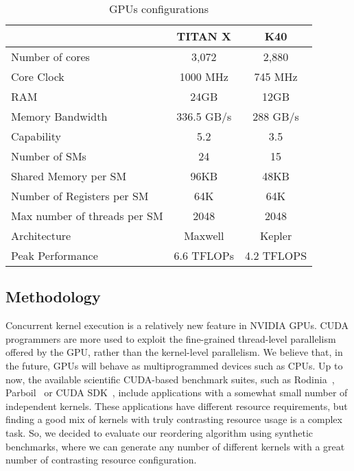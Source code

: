 \documentclass[conference]{IEEEtran}
\begin{document}
\begin{table}[]
    \centering
    \begin{tabular}{|l|c|c|} \hline
                             &  \textbf{TITAN} X & \textbf{K40} \\ \hline
Number of cores              & 3,072             & 2,880        \\ \hline
Core Clock                   & 1000 MHz          & 745 MHz      \\ \hline
RAM                          & 24GB              & 12GB         \\ \hline
Memory Bandwidth             & 336.5 GB/s        & 288 GB/s     \\ \hline
Capability                   & 5.2               & 3.5          \\ \hline
Number of SMs                & 24                & 15           \\ \hline
Shared Memory per SM         & 96KB              & 48KB         \\ \hline
Number of Registers per SM   & 64K               & 64K          \\ \hline
Max number of threads per SM & 2048              & 2048         \\ \hline
Architecture                 & Maxwell           & Kepler       \\ \hline
Peak Performance             & 6.6 TFLOPs        & 4.2 TFLOPS    \\ \hline 
    \end{tabular}
    \caption{GPUs configurations}
    \label{tab:gpuspecs}
\end{table}


\subsection{Methodology}

Concurrent kernel execution is a relatively new feature in NVIDIA GPUs. CUDA programmers are more used to exploit the fine-grained thread-level parallelism offered by the GPU, rather than the kernel-level parallelism. We believe that, in the future, GPUs will behave as multiprogrammed devices such as CPUs. Up to now, the available scientific CUDA-based benchmark suites, such as Rodinia~\cite{rodinia:2009}, Parboil~\cite{Stratton:2012} or CUDA SDK~\cite{SDK}, include applications with a somewhat small number of independent kernels.
These applications have different resource requirements, but finding a good mix of kernels with truly contrasting resource usage is a complex task. So, we decided to evaluate our reordering algorithm using synthetic benchmarks, where we can generate any number of different kernels with a great number of contrasting resource configuration. 
\end{document}
